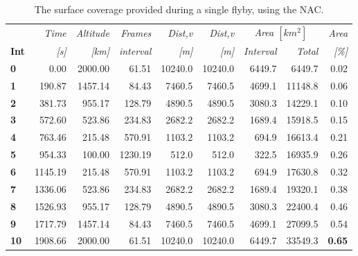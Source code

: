 \begin{table}[h!]
  \centering
    \begin{tabular}{l|r|r|r|r|r|r|r|r|}
      & \textit{Time} & \textit{Altitude} & \textit{Frames} & \textit{Dist,v} & \textit{Dist,v} & \multicolumn{2}{c|}{\textit{Area $[km^2]$}} & \multicolumn{1}{r}{\textit{Area}} \\
\textbf{Int} & \textit{[s]} & \textit{[km]} & \textit{interval} & \textit{[m]} & \textit{[m]} & \textit{Interval} & \textit{Total} & \multicolumn{1}{r}{\textit{[\%]}} \bigstrut[b]\\
\hline
\textbf{0} & 0.00  & 2000.00 & 61.51 & 10240.0 & 10240.0 & 6449.7 & 6449.7 & 0.02 \bigstrut[t]\\
\textbf{1} & 190.87 & 1457.14 & 84.43 & 7460.5 & 7460.5 & 4699.1 & 11148.8 & 0.06 \\
\textbf{2} & 381.73 & 955.17 & 128.79 & 4890.5 & 4890.5 & 3080.3 & 14229.1 & 0.10 \\
\textbf{3} & 572.60 & 523.86 & 234.83 & 2682.2 & 2682.2 & 1689.4 & 15918.5 & 0.15 \\
\textbf{4} & 763.46 & 215.48 & 570.91 & 1103.2 & 1103.2 & 694.9 & 16613.4 & 0.21 \\
\textbf{5} & 954.33 & 100.00 & 1230.19 & 512.0 & 512.0 & 322.5 & 16935.9 & 0.26 \\
\textbf{6} & 1145.19 & 215.48 & 570.91 & 1103.2 & 1103.2 & 694.9 & 17630.8 & 0.32 \\
\textbf{7} & 1336.06 & 523.86 & 234.83 & 2682.2 & 2682.2 & 1689.4 & 19320.1 & 0.38 \\
\textbf{8} & 1526.93 & 955.17 & 128.79 & 4890.5 & 4890.5 & 3080.3 & 22400.4 & 0.46 \\
\textbf{9} & 1717.79 & 1457.14 & 84.43 & 7460.5 & 7460.5 & 4699.1 & 27099.5 & 0.54 \\
\textbf{10} & 1908.66 & 2000.00 & 61.51 & 10240.0 & 10240.0 & 6449.7 & 33549.3 & \textbf{0.65} \\
\end{tabular}%
  \caption{The surface coverage provided during a single flyby, using the NAC.}
  \label{tab:nac_flyby_coverage}%
\end{table}%
